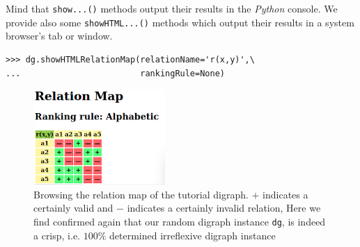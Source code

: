 Mind that \texttt{show...()} methods output their results in the \emph{Python} console. We provide also some \texttt{showHTML...()} methods which output their results in a system browser’s tab or window.
\begin{lstlisting}
>>> dg.showHTMLRelationMap(relationName='r(x,y)',\
...                        rankingRule=None)
\end{lstlisting}
\begin{figure}[ht]
\sidecaption[t]
\includegraphics[width=5cm]{Figures/1-2-relationMap1.png}
\caption{Browsing the relation map of the tutorial digraph. $+$ indicates a certainly valid and $-$ indicates a certainly  invalid relation, Here we find confirmed again that our random digraph instance \texttt{dg}, is indeed a crisp, i.e. $100\%$ determined irreflexive digraph instance}
\label{fig:1.2}       %
\end{figure}


